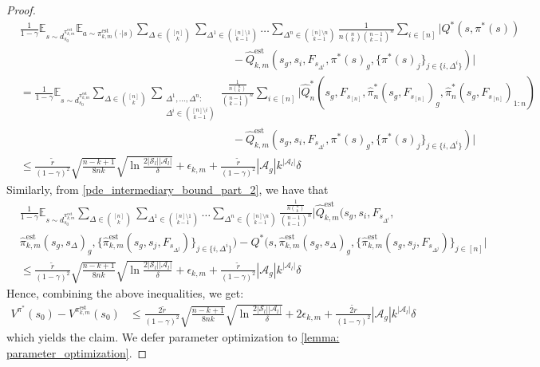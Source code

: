 \documentclass{article}
\theoremstyle{plain}
\theoremstyle{definition}
\def\est{\mathrm{est}}
\def\E{\mathbb{E}}
\begin{document}
\begin{proof}
\begin{align*}&\frac{1}{1-\gamma}\E_{s\sim d_{s_0}^{{\pi}_{k,m}^\est}}\E_{a\sim {\pi}_{k,m}^\est(\cdot|s)}\sum_{\Delta\in{[n]\choose k}}\sum_{{\Delta^1 \in {[n]\setminus 1 \choose k-1}}}\dots\sum_{{\Delta^n \in {[n]\setminus n \choose k-1}}} \frac{1}{n {n\choose k} {n-1\choose k-1}^n}\sum_{i\in[n]}\bigg|Q^*(s, \pi^*(s)) \\
&\quad\quad\quad\quad\quad\quad\quad\quad\quad\quad\quad\quad\quad\quad\quad\quad\quad\quad\quad - \hat{Q}^\est_{k,m}(s_g, s_{i},F_{s_{\Delta^i}}, \pi^*(s)_g, \{\pi^*(s)_j\}_{j\in\{i,\Delta^i\}})\bigg|\\
&=\frac{1}{1-\gamma}\E_{s\sim d_{s_0}^{{\pi}_{k,m}^\est}}\sum_{\Delta\in{[n]\choose k}}\sum_{\substack{\Delta^1,\dots,\Delta^n:\\ \Delta^i \in {[n]\setminus i \choose k-1}}} \frac{\frac{1}{n{n\choose k}}}{{n-1\choose k-1}^n}\sum_{i\in[n]}\bigg|\hat{Q}_n^*(s_g, F_{s_{[n]}}, \hat{\pi}_n^*(s_g, F_{s_{[n]}})_g, \hat{\pi}_n^*(s_g, F_{s_{[n]}})_{1:n}) \\ 
&\quad\quad\quad\quad\quad\quad\quad\quad\quad\quad\quad\quad\quad\quad\quad\quad\quad\quad\quad - \hat{Q}^\est_{k,m}(s_g, s_{i}, F_{s_{\Delta^i}}, \pi^*(s)_g, \{\pi^*(s)_j\}_{j\in\{i,\Delta^i\}})\bigg| \\
&\leq \frac{\tilde{r}}{(1-\gamma)^2}\sqrt{\frac{n-k+1}{8nk}} \sqrt{\ln\frac{2|\mathcal{S}_l||\mathcal{A}_l|}{\delta}}  +\epsilon_{k,m} +  \frac{\tilde{r}}{(1-\gamma)^2}|\mathcal{A}_g|k^{|\mathcal{A}_l|}\delta\end{align*}
Similarly, from \cref{pde_intermediary_bound_part_2}, we have that
\begin{align*}&\frac{1}{1-\gamma}\E_{s\sim d_{s_0}^{{\pi}_{k,m}^\est}}\sum_{\Delta\in{[n]\choose k}}\sum_{{\Delta^1 \in {[n]\setminus 1 \choose k-1}}}\dots\sum_{{\Delta^n \in {[n]\setminus n \choose k-1}}}\frac{\frac{1}{n{n\choose k}}}{{n-1\choose k-1}^n}\bigg|\hat{Q}^\est_{k,m}(s_g, s_{i},F_{s_{\Delta^i}}, \\ &\hat{\pi}^\est_{k,m}(s_g,s_\Delta)_g, \{\hat{\pi}_{k,m}^\est(s_g, s_{j},F_{s_{\Delta^j}})\}_{j\in\{i,\Delta^i\}}) - Q^*(s, \hat{\pi}^\est_{k,m}(s_g,s_\Delta)_g, \{\hat{\pi}^\est_{k,m}(s_g,s_{j},F_{s_{\Delta^j}})\}_{j\in[n]}\bigg|\\
&\leq \frac{\tilde{r}}{(1-\gamma)^2}\sqrt{\frac{n-k+1}{8nk}} \sqrt{\ln\frac{2|\mathcal{S}_l||\mathcal{A}_l|}{\delta}}  +\epsilon_{k,m} +  \frac{\tilde{r}}{(1-\gamma)^2}|\mathcal{A}_g|k^{|\mathcal{A}_l|}\delta
\end{align*}
Hence, combining the above inequalities, we get:
\begin{align*}V^{\pi^*}(s_0) - V^{{\pi}_{k,m}^\est}(s_0) &\leq \frac{2\tilde{r}}{(1-\gamma)^2}\sqrt{\frac{n-k+1}{8nk}} \sqrt{\ln\frac{2|\mathcal{S}_l||\mathcal{A}_l|}{\delta}}  + 2\epsilon_{k,m} +  \frac{\tilde{2r}}{(1-\gamma)^2}|\mathcal{A}_g|k^{|\mathcal{A}_l|}\delta\end{align*}
which yields the claim. We defer parameter optimization to \cref{lemma: parameter_optimization}.\qedhere 
\end{proof}
\end{document}
